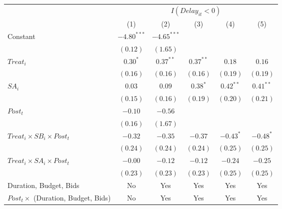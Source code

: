 \documentclass[
]{article}
\begin{document}
\begin{table}
\begin{center}
\begin{tabular}{l c c c c c}
\hline
 & \multicolumn{5}{c}{$I(Delay_{it}<0)$} \\
\cline{2-6}
 & (1) & (2) & (3) & (4) & (5) \\
\hline
Constant                                   & $-4.80^{***}$ & $-4.65^{***}$ &             &             &             \\
                                           & $(0.12)$      & $(1.65)$      &             &             &             \\
$Treat_i$                                  & $0.30^{*}$    & $0.37^{**}$   & $0.37^{**}$ & $0.18$      & $0.16$      \\
                                           & $(0.16)$      & $(0.16)$      & $(0.16)$    & $(0.19)$    & $(0.19)$    \\
$SA_i$                                     & $0.03$        & $0.09$        & $0.38^{*}$  & $0.42^{**}$ & $0.41^{**}$ \\
                                           & $(0.15)$      & $(0.16)$      & $(0.19)$    & $(0.20)$    & $(0.21)$    \\
$Post_t$                                   & $-0.10$       & $-0.56$       &             &             &             \\
                                           & $(0.16)$      & $(1.67)$      &             &             &             \\
$Treat_i \times SB_i \times Post_t$        & $-0.32$       & $-0.35$       & $-0.37$     & $-0.43^{*}$ & $-0.48^{*}$ \\
                                           & $(0.24)$      & $(0.24)$      & $(0.24)$    & $(0.25)$    & $(0.25)$    \\
$Treat_i \times SA_i \times Post_t$        & $-0.00$       & $-0.12$       & $-0.12$     & $-0.24$     & $-0.25$     \\
                                           & $(0.23)$      & $(0.23)$      & $(0.23)$    & $(0.25)$    & $(0.25)$    \\
\hline
Duration, Budget, Bids                     & No            & Yes           & Yes         & Yes         & Yes         \\
$Post_t \times $  (Duration, Budget, Bids) & No            & Yes           & Yes         & Yes         & Yes         \\

\end{tabular}
\end{center}
\end{table}
\end{document}
